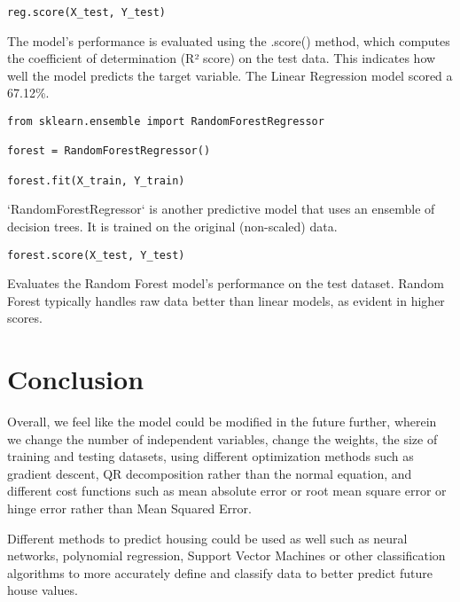 \documentclass{article}
\begin{document}
\begin{verbatim}
reg.score(X_test, Y_test)
\end{verbatim}
 
\begin{center}
The model’s performance is evaluated using the .score() method, which computes the coefficient of determination (R² score) on the test data. This indicates how well the model predicts the target variable. The Linear Regression model scored a 67.12\%.
\end{center}

\begin{verbatim}
from sklearn.ensemble import RandomForestRegressor

forest = RandomForestRegressor()

forest.fit(X_train, Y_train)
\end{verbatim}
 
\begin{center}`RandomForestRegressor` is another predictive model that uses an ensemble of decision trees. It is trained on the original (non-scaled) data.
\end{center}


\begin{verbatim}
forest.score(X_test, Y_test)
\end{verbatim}

\begin{center}Evaluates the Random Forest model’s performance on the test dataset. Random Forest typically handles raw data better than linear models, as evident in higher scores.
\end{center}

\section{Conclusion}
Overall, we feel like the model could be modified in the future further, wherein we change the number of independent variables, change the weights, the size of training and testing datasets, using different optimization methods such as gradient descent, QR decomposition rather than the normal equation, and different cost functions such as mean absolute error or root mean square error or hinge error rather than Mean Squared Error.

Different methods to predict housing could be used as well such as neural networks, polynomial regression, Support Vector Machines or other classification algorithms to more accurately define and classify data to better predict future house values. 
\end{document}
